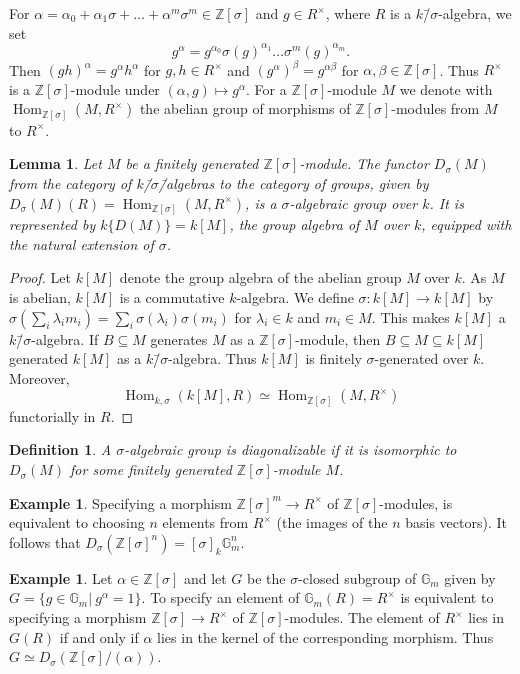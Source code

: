 \documentclass[oneside,reqno]{amsart}
\newtheorem{lemma}[theo]{Lemma}
\newtheorem{defi}[theo]{Definition}
\theoremstyle{definition}
\newtheorem{ex}[theo]{Example}
\newcommand{\Hom}{\operatorname{Hom}}
\newcommand{\s}{\sigma}
\newcommand{\ks}{$k$\=/$\s$}
\newcommand{\Gm}{\mathbb{G}_m}
\newcommand{\ZZ}{\mathbb{Z}}
\begin{document}
For $\alpha=\alpha_0+\alpha_1\s+\ldots+\alpha^m\s^m\in \ZZ[\s]$ and $g\in R^\times$, where $R$ is a \ks-algebra, we set
$$g^\alpha=g^{\alpha_0}\s(g)^{\alpha_1}\ldots\s^m(g)^{\alpha_m}.$$
Then $(gh)^\alpha=g^\alpha h^\alpha$ for $g,h\in R^\times$ and $(g^\alpha)^\beta=g^{\alpha\beta}$ for $\alpha,\beta\in \ZZ[\s]$. Thus $R^\times$ is a $\ZZ[\s]$-module under $(\alpha, g)\mapsto g^\alpha$. For a $\ZZ[\s]$-module $M$ we denote with $\Hom_{\ZZ[\s]}(M,R^\times)$ the abelian group of morphisms of $\ZZ[\s]$-modules from $M$ to $R^\times$.
\begin{lemma}
	Let $M$ be a finitely generated $\ZZ[\s]$-module. The functor $D_\s(M)$ from the category of \ks\=/algebras to the category of groups, given by $D_\s(M)(R)=\Hom_{\ZZ[\s]}(M,R^\times)$, is a $\s$-algebraic group over $k$. It is represented by $k\{D(M)\}=k[M]$, the group algebra of $M$ over $k$, equipped with the natural extension of $\s$. 
\end{lemma}	
\begin{proof}
	Let $k[M]$ denote the group algebra of the abelian group $M$ over $k$. As $M$ is abelian, $k[M]$ is a commutative $k$-algebra. We define $\s\colon k[M]\to k[M]$ by $\s(\sum_i{\lambda_im_i})=\sum_i\s(\lambda_i)\s(m_i)$ for $\lambda_i\in k$ and $m_i\in M$. This makes $k[M]$ a \ks-algebra. If $B\subseteq M$ generates $M$ as a $\ZZ[\s]$-module, then $B\subseteq M\subseteq k[M]$ generated $k[M]$ as a \ks-algebra. Thus $k[M]$ is finitely $\s$-generated over $k$. Moreover,
	$$\Hom_{k,\s}(k[M],R)\simeq\Hom_{\ZZ[\s]}(M,R^\times)$$
	functorially in $R$.	
\end{proof}	 


\begin{defi}
	A $\s$-algebraic group is \emph{diagonalizable} if it is isomorphic to $D_\s(M)$ for some finitely generated $\ZZ[\s]$-module $M$.	
\end{defi}

\begin{ex}
	Specifying a morphism $\ZZ[\s]^m\to R^\times$ of $\ZZ[\s]$-modules, is equivalent to choosing $n$ elements from $R^\times$ (the images of the $n$ basis vectors). It follows that $D_\s(\ZZ[\s]^n)=[\s]_k\Gm^n$. 
\end{ex}	

\begin{ex}
	Let $\alpha\in\ZZ[\s]$ and let $G$ be the $\s$-closed subgroup of $\Gm$ given by $G=\{g\in\Gm|\ g^\alpha=1\}$. To specify an element of $\Gm(R)=R^\times$ is equivalent to specifying a morphism $\ZZ[\s]\to R^\times$ of $\ZZ[\s]$-modules. The element of $R^\times$ lies in $G(R)$ if and only if $\alpha$ lies in the kernel of the corresponding morphism. Thus $G\simeq D_\s(\ZZ[\s]/(\alpha))$.
\end{ex}
\end{document}

